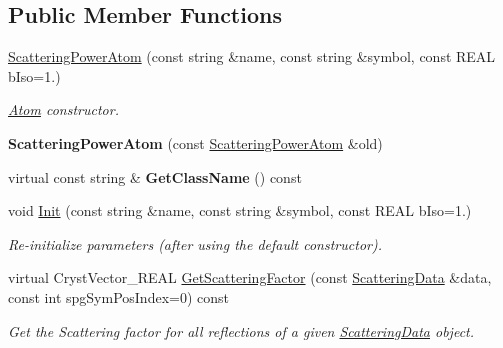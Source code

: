 \subsection*{Public Member Functions}
\begin{DoxyCompactItemize}
\item 
\mbox{\hyperlink{class_obj_cryst_1_1_scattering_power_atom_a9e77e9d0317491d62b392b891f0329e5}{Scattering\+Power\+Atom}} (const string \&name, const string \&symbol, const R\+E\+AL b\+Iso=1.)
\begin{DoxyCompactList}\small\item\em \mbox{\hyperlink{class_obj_cryst_1_1_atom}{Atom}} constructor. \end{DoxyCompactList}\item 
\mbox{\label{class_obj_cryst_1_1_scattering_power_atom_a72487203dd97ef8a5701f451bb23b644}} 
{\bfseries Scattering\+Power\+Atom} (const \mbox{\hyperlink{class_obj_cryst_1_1_scattering_power_atom}{Scattering\+Power\+Atom}} \&old)
\item 
\mbox{\label{class_obj_cryst_1_1_scattering_power_atom_a9eab9adcc33fc4e048be3ff5b2297cf7}} 
virtual const string \& {\bfseries Get\+Class\+Name} () const
\item 
\mbox{\label{class_obj_cryst_1_1_scattering_power_atom_a7f599ee186028c6d065d39b13b15a194}} 
void \mbox{\hyperlink{class_obj_cryst_1_1_scattering_power_atom_a7f599ee186028c6d065d39b13b15a194}{Init}} (const string \&name, const string \&symbol, const R\+E\+AL b\+Iso=1.)
\begin{DoxyCompactList}\small\item\em Re-\/initialize parameters (after using the default constructor). \end{DoxyCompactList}\item 
virtual Cryst\+Vector\+\_\+\+R\+E\+AL \mbox{\hyperlink{class_obj_cryst_1_1_scattering_power_atom_a2ae5ca3726d70f371acfbafc97d300ab}{Get\+Scattering\+Factor}} (const \mbox{\hyperlink{class_obj_cryst_1_1_scattering_data}{Scattering\+Data}} \&data, const int spg\+Sym\+Pos\+Index=0) const
\begin{DoxyCompactList}\small\item\em Get the Scattering factor for all reflections of a given \mbox{\hyperlink{class_obj_cryst_1_1_scattering_data}{Scattering\+Data}} object. \end{DoxyCompactList}\item 

\end{DoxyCompactItemize}

